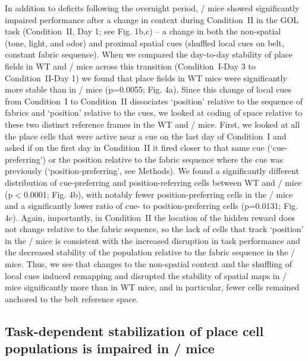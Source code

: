 In addition to deficits following the overnight period, \df/ mice showed significantly impaired performance after a change in context during Condition~II in the GOL task (Condition~II, Day 1; see Fig. 1b,c) -- a change in both the non-spatial (tone, light, and odor) and proximal spatial cues (shuffled local cues on belt, constant fabric sequence). When we compared the day-to-day stability of place fields in WT and \df/ mice across this transition (Condition~I-Day 3 to Condition~II-Day 1) we found that place fields in WT mice were significantly more stable than in \df/ mice (p=0.0055; Fig. 4a). Since this change of local cues from Condition~I to Condition~II dissociates `position' relative to the sequence of fabrics and `position' relative to the cues, we looked at coding of space relative to these two distinct reference frames in the WT and \df/ mice. First, we looked at all the place cells that were active near a cue on the last day of Condition~I and asked if on the first day in Condition~II it fired closer to that same cue (`cue-preferring') or the position relative to the fabric sequence where the cue was previously (`position-preferring', see Methods). We found a significantly different distribution of cue-preferring and position-referring cells between WT and \df/ mice (p$<$0.0001; Fig. 4b), with notably fewer position-preferring cells in the \df/ mice and a significantly lower ratio of cue- to position-preferring cells (p=0.0131; Fig. 4c). Again, importantly, in Condition~II the location of the hidden reward does not change relative to the fabric sequence, so the lack of cells that track `position' in the \df/ mice is consistent with the increased disruption in task performance and the decreased stability of the population relative to the fabric sequence in the \df/ mice. Thus, we see that changes to the non-spatial context and the shuffling of local cues induced remapping and disrupted the stability of spatial maps in \df/ mice significantly more than in WT mice, and in particular, fewer cells remained anchored to the belt reference space.

\subsection{Task-dependent stabilization of place cell populations is impaired in \df/ mice}

